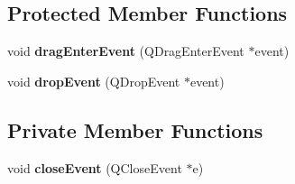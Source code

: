 \subsection*{Protected Member Functions}
\begin{DoxyCompactItemize}
\item 
\hypertarget{class_main_window_a671bf73078069470c19965a3d948b6fa}{}void {\bfseries drag\+Enter\+Event} (Q\+Drag\+Enter\+Event $\ast$event)\label{class_main_window_a671bf73078069470c19965a3d948b6fa}

\item 
\hypertarget{class_main_window_ae7b97e68c51358f6f36be3c40b89c01c}{}void {\bfseries drop\+Event} (Q\+Drop\+Event $\ast$event)\label{class_main_window_ae7b97e68c51358f6f36be3c40b89c01c}

\end{DoxyCompactItemize}
\subsection*{Private Member Functions}
\begin{DoxyCompactItemize}
\item 
\hypertarget{class_main_window_a8a5bf36f9544ed3ec3a9eea9b7154564}{}void {\bfseries close\+Event} (Q\+Close\+Event $\ast$e)\label{class_main_window_a8a5bf36f9544ed3ec3a9eea9b7154564}

\end{DoxyCompactItemize}
